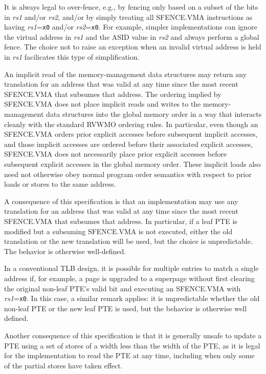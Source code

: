 \begin{commentary}
It is always legal to over-fence, e.g., by fencing only based on a subset
of the bits in {\em rs1} and/or {\em rs2}, and/or by simply treating all
SFENCE.VMA instructions as having {\em rs1}={\tt x0} and/or
{\em rs2}={\tt x0}.  For example, simpler implementations can ignore the
virtual address in {\em rs1} and the ASID value in {\em rs2} and always perform
a global fence.  The choice not to raise an exception when an invalid virtual
address is held in {\em rs1} facilicates this type of simplification.
\end{commentary}

An implicit read of the memory-management data structures may return any
translation for an address that was valid at
any time since the most recent SFENCE.VMA that subsumes that address.  The
ordering implied by SFENCE.VMA does not place implicit reads and writes to the
memory-management data structures into the global memory order in a way that
interacts cleanly with the standard RVWMO ordering rules.  In particular, even
though an SFENCE.VMA orders prior explicit accesses before subsequent implicit
accesses, and those implicit accesses are ordered before their associated
explicit accesses, SFENCE.VMA does not necessarily place prior explicit
accesses before subsequent explicit accesses in the global memory order.  These
implicit loads also need not otherwise obey normal program order semantics with
respect to prior loads or stores to the same address.

\begin{commentary}
A consequence of this specification is that an implementation may use any
translation for an address that was valid at any time since the most recent
SFENCE.VMA that subsumes that address.
In particular, if a leaf PTE is modified but a subsuming SFENCE.VMA is not
executed, either the old translation or the new translation will be used, but
the choice is unpredictable.
The behavior is otherwise well-defined.

In a conventional TLB design, it is possible for multiple entries to match a
single address if, for example, a page is upgraded to a superpage without first
clearing the original non-leaf PTE's valid bit and executing an SFENCE.VMA with
{\em rs1}={\tt x0}.
In this case, a similar remark applies: it is unpredictable whether the old
non-leaf PTE or the new leaf PTE is used, but the behavior is otherwise well
defined.

Another consequence of this specification is that it is generally unsafe to
update a PTE using a set of stores of a width less than the width of the PTE,
as it is legal for the implementation to read the PTE at any time, including
when only some of the partial stores have taken effect.
\end{commentary}


